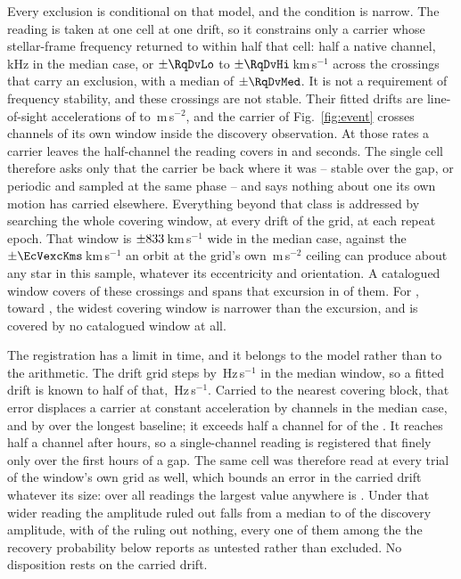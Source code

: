 Every exclusion is conditional on that model, and the condition is narrow. The reading is taken at one cell at one drift, so it constrains only a
carrier whose stellar-frame frequency returned to within half that cell:
half a native channel, \RqHalfChanKHz\,kHz in the median case, or
$\pm\RqDvLo$ to $\pm\RqDvHi$\,km\,s$^{-1}$ across the \RcNExcl{}
crossings that carry an exclusion, with a median of $\pm\RqDvMed$. It is not a requirement of frequency stability, and these crossings are
not stable. Their fitted drifts are line-of-sight accelerations of
\ZtALosLo{} to \ZtALosHi\,m\,s$^{-2}$, and the carrier of
Fig.~\ref{fig:event} crosses \EvADriftChan{} channels of its own window
inside the discovery observation. At those rates a carrier leaves the
half-channel the reading covers in \ZtSxLeaveSec{} and \ZtCpLeaveSec{}
seconds. The single cell therefore asks
only that the carrier be back where it was -- stable over the gap, or
periodic and sampled at the same phase -- and says nothing about one its own
motion has carried elsewhere. Everything beyond that class is addressed by searching the whole covering
window, at every drift of the grid, at each repeat epoch. That window is
$\pm833$\,km\,s$^{-1}$ wide in the median case, against the
$\pm\EcVexcKms$\,km\,s$^{-1}$ an orbit at the grid's own
\WdAGrid\,m\,s$^{-2}$ ceiling can produce about any star in this sample,
whatever its eccentricity and orientation. A catalogued window covers
\WdNOrbTot{} of these \RcNExcl{} crossings and spans that excursion in
\EcNSpan{} of them. For \EcNShort, toward \EcShortStarList, the widest
covering window is narrower than the excursion, and \WdNNoCov{} is covered by
no catalogued window at all.

The registration has a limit in time, and it belongs to the model rather than
to the arithmetic. The drift grid steps by \ZtStepMed\,Hz\,s$^{-1}$ in the
median window, so a fitted drift is known to half of that,
\ZtHalfStepMed\,Hz\,s$^{-1}$. Carried to the nearest covering block, that
error displaces a carrier at constant acceleration by \ZtRegChanMed{}
channels in the median case, and by \ZtRegChanFarMed{} over the longest
baseline; it exceeds half a channel for \ZtNRegNear{} of the \RcNExcl. It
reaches half a channel after \ZtRegHoursMed{} hours, so a single-channel
reading is registered that finely only over the first hours of a gap. The
same cell was therefore read at every trial of the window's own grid as well,
which bounds an error in the carried drift whatever its size: over all
\RcNRepeatMeas{} readings the largest value anywhere is \RcTMax. Under that
wider reading the amplitude ruled out falls from a median \RcFracMed{} to
\ZtFracWideMed{} of the discovery amplitude, with \ZtNWideVac{} of the
\RcNExcl{} ruling out nothing, every one of them among the \HjNPowerLo{}
the recovery probability below reports as untested rather than
excluded. No
disposition rests on the carried drift.

